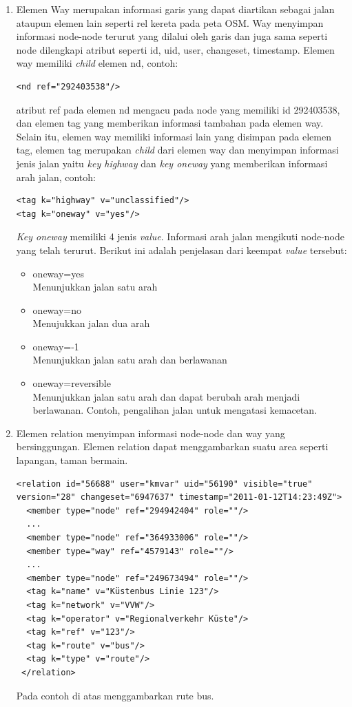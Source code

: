 \begin{itemize}
\begin{enumerate}
\item Elemen Way merupakan informasi garis yang dapat diartikan sebagai jalan
ataupun elemen lain seperti rel kereta pada peta OSM. Way menyimpan informasi
node-node terurut yang dilalui oleh garis dan juga sama seperti node dilengkapi
atribut seperti id, uid, user, changeset, timestamp. Elemen way memiliki \textit{child}
elemen nd, contoh:
\begin{verbatim}
<nd ref="292403538"/>
\end{verbatim}
atribut ref pada elemen nd mengacu pada node yang memiliki id 292403538, dan
elemen tag yang memberikan informasi tambahan pada elemen way. Selain itu,
elemen way memiliki informasi lain yang disimpan pada elemen tag, elemen tag
merupakan \textit{child} dari elemen way dan menyimpan informasi jenis jalan
yaitu \textit{key highway} dan \textit{key oneway} yang memberikan informasi
arah jalan, contoh:
\begin{verbatim}
<tag k="highway" v="unclassified"/>
<tag k="oneway" v="yes"/>
\end{verbatim}
\textit{Key oneway} memiliki 4 jenis \textit{value}. Informasi arah jalan
mengikuti node-node yang telah terurut. Berikut ini adalah
penjelasan dari keempat \textit{value} tersebut:
\begin{itemize}
  \item oneway=yes \\
  Menunjukkan jalan satu arah
  
  \item oneway=no \\
  Menujukkan jalan dua arah
  
  \item oneway=-1 \\
  Menunjukkan jalan satu arah dan berlawanan
  
  \item oneway=reversible \\
  Menunjukkan jalan satu arah dan dapat berubah arah menjadi berlawanan. Contoh,
  pengalihan jalan untuk mengatasi kemacetan.
\end{itemize}

\item Elemen relation menyimpan informasi node-node dan way yang bersinggungan.
Elemen relation dapat menggambarkan suatu area seperti lapangan, taman
bermain.
\begin{lstlisting}
<relation id="56688" user="kmvar" uid="56190" visible="true" version="28" changeset="6947637" timestamp="2011-01-12T14:23:49Z">
  <member type="node" ref="294942404" role=""/>
  ...
  <member type="node" ref="364933006" role=""/>
  <member type="way" ref="4579143" role=""/>
  ...
  <member type="node" ref="249673494" role=""/>
  <tag k="name" v="Küstenbus Linie 123"/>
  <tag k="network" v="VVW"/>
  <tag k="operator" v="Regionalverkehr Küste"/>
  <tag k="ref" v="123"/>
  <tag k="route" v="bus"/>
  <tag k="type" v="route"/>
 </relation>
\end{lstlisting}
Pada contoh di atas menggambarkan rute bus.
\end{enumerate}
\end{itemize}

